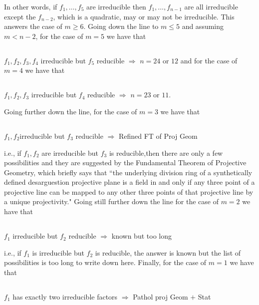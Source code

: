In other words, if $f_{1}, \ldots, f_{5}$ are irreducible then $f_{1}, \ldots, f_{n-1}$ are all irreducible except the $f_{n-2}$, which is a quadratic, may or may not be irreducible. This answers the case of $m \geq 6$. Going down the line  to $m \leq 5$ and assuming $m<n-2$, for the case of $m=5$ we have that

\subsection{}\label{chap1-sec2.2}
$f_{1}, f_{2}, f_{3}, f_{4}$ irreducible but $f_{5}$ reducible $\Rightarrow$ $n=24$ or $12$ and for the case of $m=4$ we have that

\subsection{}\label{chap1-sec2.3}
$f_{1}, f_{2}, f_{3}$ irreducible but $f_{4}$ reducible $\Rightarrow$ $n=23$ or $11$.

Going further down the line, for the case of $m=3$ we have that

\subsection{}\label{chap1-sec2.4}
$f_{1}, f_{2}$\pageoriginale irreducible but $f_{3}$ reducible $\Rightarrow$ Refined FT of Proj Geom

i.e., if $f_{1}, f_{2}$ are irreducible but $f_{3}$ is reducible,then there are only a few possibilities and they are suggested by the Fundamental Theorem  of  Projective Geometry, which briefly says that ``the underlying division ring of a synthetically defined desarguestion projective plane is a field in and only if any three point of a projective line can be mapped to any other three points of that projective line by a unique projectivity." Going still further down the line for the case of $m=2$ we have that   

\subsection{}\label{chap1-sec2.5}
$f_{1}$ irreducible but $f_{2}$ reducible $\Rightarrow$ known but too long

i.e., if $f_{1}$ is irreducible but $f_{2}$ is reducible, the answer is known but the list of possibilities is too long to write down here. Finally, for the case of $m=1$ we have that

\subsection{}\label{chap1-sec2.6}
$f_{1}$ has exactly two irreducible factors $\Rightarrow$ Pathol proj Geom $+$ Stat


